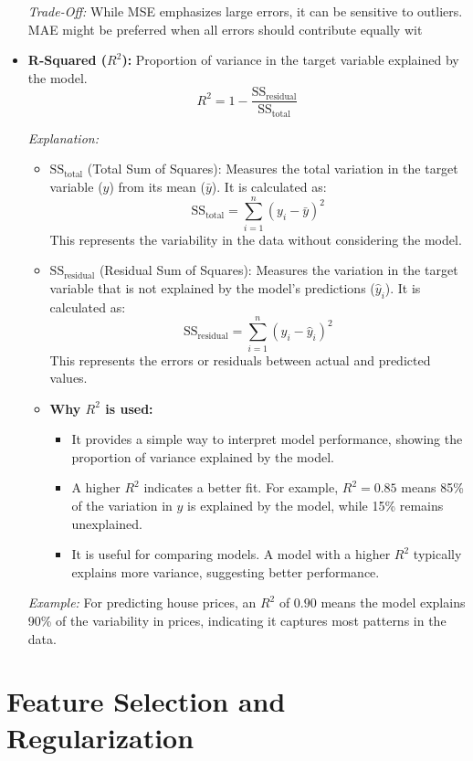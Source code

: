 \documentclass[11pt]{article}
\begin{document}
\begin{itemize}
    \textit{Trade-Off:} While MSE emphasizes large errors, it can be sensitive to outliers. MAE might be preferred when all errors should contribute equally wit
 \item \textbf{R-Squared ($R^2$):} Proportion of variance in the target variable explained by the model. 
\[
R^2 = 1 - \frac{\text{SS}_{\text{residual}}}{\text{SS}_{\text{total}}}
\]

\textit{Explanation:}
\begin{itemize}
    \item \(\text{SS}_{\text{total}}\) (Total Sum of Squares): Measures the total variation in the target variable (\(y\)) from its mean (\(\bar{y}\)). It is calculated as:
    \[
    \text{SS}_{\text{total}} = \sum_{i=1}^n (y_i - \bar{y})^2
    \]
    This represents the variability in the data without considering the model.

    \item \(\text{SS}_{\text{residual}}\) (Residual Sum of Squares): Measures the variation in the target variable that is not explained by the model's predictions (\(\hat{y}_i\)). It is calculated as:
    \[
    \text{SS}_{\text{residual}} = \sum_{i=1}^n (y_i - \hat{y}_i)^2
    \]
    This represents the errors or residuals between actual and predicted values.

    \item \textbf{Why $R^2$ is used:}
    \begin{itemize}
        \item It provides a simple way to interpret model performance, showing the proportion of variance explained by the model.
        \item A higher $R^2$ indicates a better fit. For example, $R^2 = 0.85$ means 85\% of the variation in \(y\) is explained by the model, while 15\% remains unexplained.
        \item It is useful for comparing models. A model with a higher $R^2$ typically explains more variance, suggesting better performance.
    \end{itemize}
\end{itemize}

\textit{Example:} For predicting house prices, an $R^2$ of $0.90$ means the model explains 90\% of the variability in prices, indicating it captures most patterns in the data.

\end{itemize}

\section{Feature Selection and Regularization}
\end{document}
